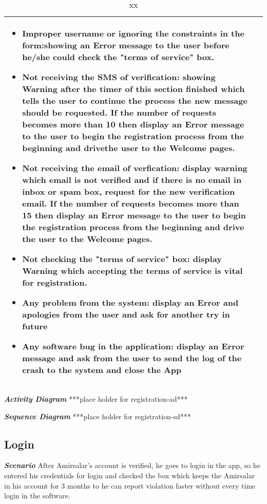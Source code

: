 \begin{table}[!hbtp]
\begin{tabulary}{\textwidth}{|J|J|}
\begin{minipage}[t]{0.8\textwidth}
\begin{itemize}
\item Improper username or ignoring the constraints in the form:showing an Error message to the user before he/she could check the "terms of service" box.
\item Not receiving the SMS of verification: showing Warning after the timer of this section finished which tells the user to continue the process the new message should be requested. If the number of requests becomes more than 10 then display an Error message to the user to begin the registration process from the beginning and drivethe user to the Welcome pages.
\item Not receiving the email of verfication: display warning which email is not verified and if there is no email in inbox or spam box, request for the new verification email. If the number of requests becomes more than 15 then display an Error message to the user to begin the registration process from the beginning and drive the user to the Welcome pages.
\item Not checking the "terms of service" box: display Warning which accepting the terms of service is vital for registration.
\item Any problem from the system: display an Error and apologies from the user and ask for another try in future
\item Any software bug in the application: display an Error message and ask from the user to send the log of the crash to the system and close the App
\end{itemize}
\end{minipage}\\
\hline
\end{tabulary}
\caption{\label{tab:xx}xx}
\end{table}

\emph{\textbf{Activity Diagram}}
***place holder for registration-ad***

\emph{\textbf{Sequence Diagram}}
***place holder for registration-sd***

\subsection{Login}

\emph{\textbf{Scenario}}
After Amirsalar's account is verified, he goes to login in the app, so he entered his credentials for login and checked the box which keeps the Amirsalar in his account for 3 months to he can report violation faster without every time login in the software.

